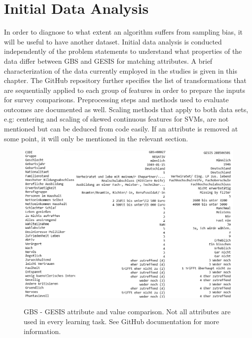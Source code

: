 \chapter{Initial Data Analysis}\label{Sec:Initial Data Analysis}

In order to diagnose to what extent an algorithm suffers from sampling bias, it will be useful to have another dataset. Initial data analysis is conducted independently of the problem statements to understand what properties of the data differ between GBS and GESIS for matching attributes. A brief characterization of the data currently employed in the studies is given in this chapter. The GitHub repository further specifies the list of transformations that are sequentially applied to each group of features in order to prepare the inputs for survey comparisons. Preprocessing steps and methods used to evaluate outcomes are documented as well. Scaling methods that apply to both data sets, e.g: centering and scaling of skewed continuous features for SVMs, are not mentioned but can be deduced from code easily. If an attribute is removed at some point, it will only be mentioned in the relevant section.

\begin{figure}[ht]
	\begin{center}
		\captionsetup{width= 425pt}
		\includegraphics[scale=0.52,angle=0]{fig/values_compare}
		\label{std}
		\caption{GBS - GESIS attribute and value comparison. Not all attributes are used in every learning task. See GitHub documentation for more information.}
	\end{center}
\end{figure}

